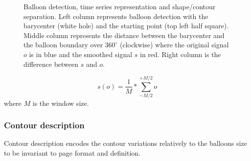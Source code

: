 	\begin{figure}	%
	  \centering
		\caption[Balloon contour time series]{Balloon detection, time series representation and shape/contour separation. Left column represents balloon detection with the barycenter (white hole) and the starting point (top left half square). Middle column represents the distance between the barycenter and the balloon boundary over $360^\circ$ (clockwise) where the original signal $o$ is in blue and the smoothed signal $s$ in red. Right column is the difference between $s$ and $o$.}
		\label{fig:be:time_series}
	\end{figure}

\begin{equation}
\label{eq:be:smooth}
 s(o) = \frac{1}{M} * \sum_{-M/2}^{+M/2} o
\end{equation}
where $M$ is the window size.%



\subsubsection{Contour description}
\label{sec:be:description}

Contour description encodes the contour variations relatively to the balloons size to be invariant to page format and definition.

